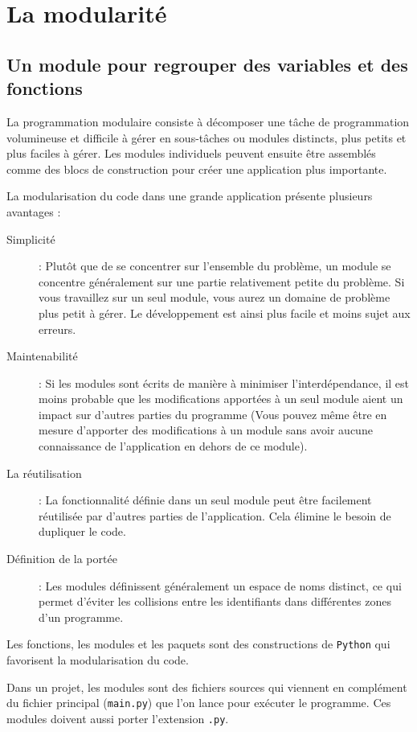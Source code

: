 \documentclass[a4paper,11pt]{book}
\begin{document}
\chapter{La modularité}
\section{Un module pour regrouper des variables et des fonctions}\label{modularité}
La programmation modulaire consiste à décomposer une tâche de programmation volumineuse et difficile à gérer en sous-tâches ou modules distincts, plus petits et plus faciles à gérer. Les modules individuels peuvent ensuite être assemblés comme des blocs de construction pour créer une application plus importante.
\medskip

La modularisation du code dans une grande application présente plusieurs avantages :
\begin{description}
	\item[Simplicité] : Plutôt que de se concentrer sur l'ensemble du problème, un module se concentre généralement sur une partie relativement petite du problème. Si vous travaillez sur un seul module, vous aurez un domaine de problème plus petit à gérer. Le développement est ainsi plus facile et moins sujet aux erreurs.
	\item[Maintenabilité] : Si les modules sont écrits de manière à minimiser l'interdépendance, il est moins probable que les modifications apportées à un seul module aient un impact sur d'autres parties du programme (Vous pouvez même être en mesure d'apporter des modifications à un module sans avoir aucune connaissance de l'application en dehors de ce module).
	\item[La réutilisation] : La fonctionnalité définie dans un seul module peut être facilement réutilisée par d'autres parties de l'application. Cela élimine le besoin de dupliquer le code.
	\item[Définition de la portée] : Les modules définissent généralement un espace de noms distinct, ce qui permet d'éviter les collisions entre les identifiants dans différentes zones d'un programme.
\end{description}
\medskip

Les fonctions, les modules et les paquets sont des constructions de \texttt{Python} qui favorisent la modularisation du code.
\medskip

Dans un projet, les modules sont des fichiers sources qui viennent en complément du fichier principal (\texttt{main.py}) que l'on lance pour exécuter le programme. Ces modules doivent aussi porter l'extension \texttt{.py}.
\medskip
\end{document}
